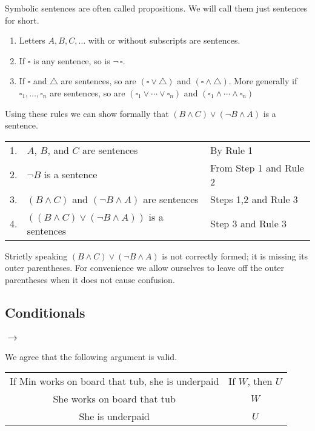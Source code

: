 \documentclass[letterpaper, 11pt]{article}
\theoremstyle{definition}
\begin{document}
Symbolic sentences are often called propositions. We will call them just sentences for short. 
 
\begin{enumerate}
\item Letters $A, B, C,\ldots$ with or without subscripts are sentences.
\item If $\square$ is any sentence, so is $\neg\, \square$.
\item If $\square$ and $\triangle$ are sentences, so are $(\square\vee \triangle)$ and $(\square\wedge \triangle)$. More generally if $\square_1,\ldots, \square_n$ are sentences, so are $(\square_1\vee \cdots \vee \square_n)$ and $(\square_1\wedge \cdots \wedge \square_n)$
\end{enumerate}

Using these rules we can show formally that $(B\wedge C) \vee (\neg B \wedge A)$ is a sentence.

\begin{tabular}{lll}
1. &$A$, $B$, and $C$ are sentences & By Rule 1\\
2. &$\neg B$ is a sentence & From Step 1 and Rule 2\\
3. &$(B\wedge C)$ and $(\neg B \wedge A)$ are sentences & Steps 1,2 and Rule 3\\
4. &$((B\wedge C)\vee(\neg B \wedge A))$ is a sentences & Step 3 and Rule 3\\
\end{tabular}

Strictly speaking  $(B\wedge C) \vee (\neg B \wedge A)$ is not correctly formed; it is missing its outer parentheses. For convenience we allow ourselves to leave off the outer parentheses when it does not cause confusion.

\subsection{Conditionals}

\subsubsection{$\to$}

We agree that the following argument is valid. 

\begin{center}
\begin{tabular}{cc}
If Min works on board that tub, she is underpaid &If $W$, then $U$\\
She works on board that tub &$W$\\\hline
\rule{0pt}{12pt}She is underpaid & $U$
\end{tabular}
\end{center}
\end{document}
